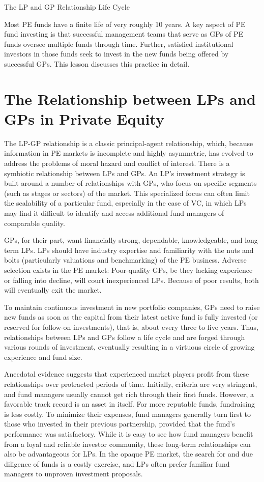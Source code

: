 \documentclass[11pt]{article}
\begin{document}
The LP and GP Relationship Life Cycle

Most PE funds have a finite life of very roughly 10 years. A key aspect of PE fund investing is that successful management teams that serve as GPs of PE funds oversee multiple funds through time. Further, satisfied institutional investors in those funds seek to invest in the new funds being offered by successful GPs. This lesson discusses this practice in detail.

\section*{The Relationship between LPs and GPs in Private Equity}
The LP-GP relationship is a classic principal-agent relationship, which, because information in PE markets is incomplete and highly asymmetric, has evolved to address the problems of moral hazard and conflict of interest. There is a symbiotic relationship between LPs and GPs. An LP's investment strategy is built around a number of relationships with GPs, who focus on specific segments (such as stages or sectors) of the market. This specialized focus can often limit the scalability of a particular fund, especially in the case of VC, in which LPs may find it difficult to identify and access additional fund managers of comparable quality.

GPs, for their part, want financially strong, dependable, knowledgeable, and long-term LPs. LPs should have industry expertise and familiarity with the nuts and bolts (particularly valuations and benchmarking) of the PE business. Adverse selection exists in the PE market: Poor-quality GPs, be they lacking experience or falling into decline, will court inexperienced LPs. Because of poor results, both will eventually exit the market.

To maintain continuous investment in new portfolio companies, GPs need to raise new funds as soon as the capital from their latest active fund is fully invested (or reserved for follow-on investments), that is, about every three to five years. Thus, relationships between LPs and GPs follow a life cycle and are forged through various rounds of investment, eventually resulting in a virtuous circle of growing experience and fund size.

Anecdotal evidence suggests that experienced market players profit from these relationships over protracted periods of time. Initially, criteria are very stringent, and fund managers usually cannot get rich through their first funds. However, a favorable track record is an asset in itself. For more reputable funds, fundraising is less costly. To minimize their expenses, fund managers generally turn first to those who invested in their previous partnership, provided that the fund's performance was satisfactory. While it is easy to see how fund managers benefit from a loyal and reliable investor community, these long-term relationships can also be advantageous for LPs. In the opaque PE market, the search for and due diligence of funds is a costly exercise, and LPs often prefer familiar fund managers to unproven investment proposals.
\end{document}
